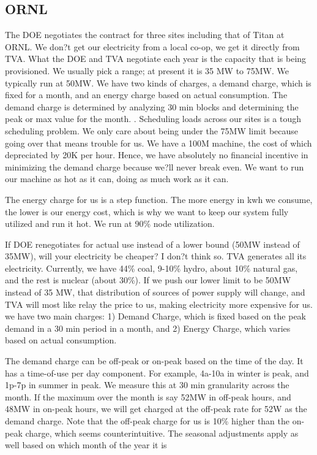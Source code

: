 \subsection{ORNL}
The DOE negotiates the contract for three sites including that of Titan at ORNL.  We don?t get our electricity from a local co-op, we get it directly from TVA. What the DOE and TVA negotiate each year is the capacity that is being provisioned. We usually pick a range; at present it is 35 MW to 75MW. We typically run at 50MW. We have two kinds of charges, a demand charge, which is fixed for a month, and an energy charge based on actual consumption. The demand charge is determined by analyzing 30 min blocks and determining the peak or max value for the month. . Scheduling loads across our sites is a tough scheduling problem. We only care about being under the 75MW limit because going over that means trouble for us. We have a 100M machine, the cost of which depreciated by 20K per hour. Hence, we have absolutely no financial incentive in minimizing the demand charge because we?ll never break even. We want to run our machine as hot as it can, doing as much work as it can. 

The energy charge for us is a step function. The more energy in kwh we consume, the lower is our energy cost, which is why we want to keep our system fully utilized and run it hot. We run at 90\% node utilization. 

If DOE renegotiates for actual use instead of a lower bound (50MW instead of 35MW), will your electricity be cheaper?
I don?t think so. TVA generates all its electricity. Currently, we have 44\% coal, 9-10\% hydro, about 10\% natural gas, and the rest is nuclear (about 30\%). If we push our lower limit to be 50MW instead of 35 MW, that distribution of sources of power supply will change, and TVA will most like relay the price to us, making electricity more expensive for us. we have two main charges: 
1)	Demand Charge, which is fixed based on the peak demand in a 30 min period in a month, and
2)	Energy Charge, which varies based on actual consumption.

The demand charge can be off-peak or on-peak based on the time of the day. It has a time-of-use per day component. For example, 4a-10a in winter is peak, and 1p-7p in summer in peak. We measure this at 30 min granularity across the month. If the maximum over the month is say 52MW in off-peak hours, and 48MW in on-peak hours, we will get charged at the off-peak rate for 52W as the demand charge. Note that the off-peak charge for us is 10\% higher than the on-peak charge, which seems counterintuitive. The seasonal adjustments apply as well based on which month of the year it is

